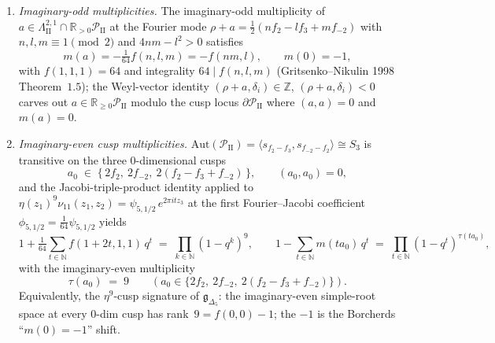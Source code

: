 \begin{lemma}
\begin{enumerate}[label=\textup{(\roman*)},leftmargin=1.5em]
\[
 \tfrac{1}{64}\Delta_5(2z) = e^{-\pi i(\rho,z)}\!\!\prod_{\alpha\in\Delta_+}\!\bigl(1 - e^{-\pi i(\alpha,z)}\bigr)^{\mathrm{mult}\,\alpha} = e^{\pi i(z_1+z_2+z_3)}\!\!\!\!\prod_{\substack{n,l,m\in\mathbb Z\\(n,l,m)>0}}\!\!\!(1 - e^{2\pi i(n z_1 + l z_2 + m z_3)})^{f(nm,l)},
\]
where $(n,l,m) > 0$ means $n\geq 0$, $m\geq 0$, and $l\in\mathbb Z$ is arbitrary if $n+m>0$, or $n=m=0$ and $l<0$ \textup{(}Gritsenko--Nikulin 1998 Theorem~$2.1$\textup{)}.
Here $\mathrm{mult}\,\alpha$ is the signed root character
$\operatorname{sdim}\mathfrak g_\alpha$ seen by the denominator
product. It is not an ordinary root-space dimension until a
parity-split source fixture, or equivalently the finite
Hall--Borcherds recognition datum, lifts it to
$\mathfrak g_{\alpha,0}\oplus\mathfrak g_{\alpha,1}$ with
$\dim\mathfrak g_{\alpha,0}-\dim\mathfrak g_{\alpha,1}=f(nm,l)$.
\item \emph{Imaginary-odd multiplicities.} The imaginary-odd multiplicity of $a\in\Lambda^{2,1}_{\mathrm{II}}\cap\mathbb R_{>0}\mathcal P_{\mathrm{II}}$ at the Fourier mode $\rho + a = \tfrac12(n f_2 - l f_3 + m f_{-2})$ with $n,l,m\equiv 1\pmod 2$ and $4nm-l^2>0$ satisfies
\[
 m(a) = -\tfrac{1}{64}f(n,l,m) = -f(nm,l),\qquad m(0) = -1,
\]
with $f(1,1,1) = 64$ and integrality $64\mid f(n,l,m)$ \textup{(}Gritsenko--Nikulin 1998 Theorem~$1.5$\textup{)}; the Weyl-vector identity $(\rho + a, \delta_i)\in\mathbb Z$, $(\rho + a, \delta_i) < 0$ carves out $a\in\mathbb R_{\geq 0}\mathcal P_{\mathrm{II}}$ modulo the cusp locus $\partial\mathcal P_{\mathrm{II}}$ where $(a,a)=0$ and $m(a) = 0$.
\item \emph{Imaginary-even cusp multiplicities.} $\mathrm{Aut}(\mathcal P_{\mathrm{II}}) = \langle s_{f_2-f_3}, s_{f_{-2}-f_2}\rangle\cong S_3$ is transitive on the three $0$-dimensional cusps
\[
 a_0 \;\in\; \{\, 2 f_2,\ 2 f_{-2},\ 2(f_2 - f_3 + f_{-2})\,\},\qquad (a_0, a_0) = 0,
\]
and the Jacobi-triple-product identity applied to $\eta(z_1)^9 \nu_{11}(z_1,z_2) = \psi_{5,1/2}\,e^{2\pi i t z_3}$ at the first Fourier--Jacobi coefficient $\phi_{5,1/2} = \tfrac{1}{64}\psi_{5,1/2}$ yields
\[
 1 + \tfrac{1}{64}\sum_{t\in\mathbb N} f(1+2t,1,1)\, q^t \;=\; \prod_{k\in\mathbb N}(1-q^k)^{9},\qquad 1 - \sum_{t\in\mathbb N} m(t a_0)\, q^t \;=\; \prod_{t\in\mathbb N}(1-q^t)^{\tau(t a_0)},
\]
with the imaginary-even multiplicity
\[
 \boxed{\tau(a_0) \;=\; 9} \qquad (a_0 \in \{2f_2,\ 2f_{-2},\ 2(f_2 - f_3 + f_{-2})\}).
\]
Equivalently, the $\eta^9$-cusp signature of $\mathfrak g_{\Delta_5}$: the imaginary-even simple-root space at every $0$-dim cusp has rank~$9 = f(0,0) - 1$; the $-1$ is the Borcherds ``$m(0)=-1$'' shift.

\end{enumerate}
\end{lemma}
